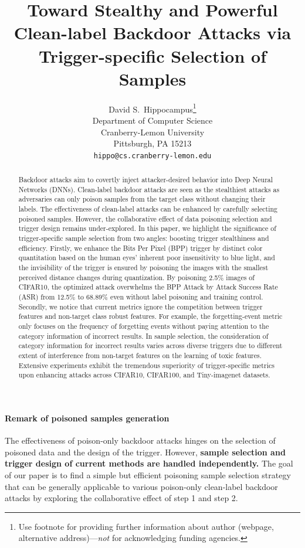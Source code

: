 \documentclass{article}
\title{Toward Stealthy and Powerful Clean-label Backdoor Attacks via Trigger-specific Selection of Samples}
\author{%
  David S.~Hippocampus\thanks{Use footnote for providing further information
    about author (webpage, alternative address)---\emph{not} for acknowledging
    funding agencies.} \\
  Department of Computer Science\\
  Cranberry-Lemon University\\
  Pittsburgh, PA 15213 \\
  \texttt{hippo@cs.cranberry-lemon.edu} \\
}
\begin{document}
\maketitle


\begin{abstract}
Backdoor attacks aim to covertly inject attacker-desired behavior into Deep Neural Networks (DNNs). Clean-label backdoor attacks are seen as the stealthiest attacks as adversaries can only poison samples from the target class without changing their labels. The effectiveness of clean-label attacks can be enhanced by carefully selecting poisoned samples. However, the collaborative effect of data poisoning selection and trigger design remains under-explored. In this paper, we highlight the significance of trigger-specific sample selection from two angles: boosting trigger stealthiness and efficiency. Firstly, we enhance the Bits Per Pixel (BPP) trigger by distinct color quantitation based on the human eyes' inherent poor insensitivity to blue light, and the invisibility of the trigger is ensured by poisoning the images with the smallest perceived distance changes during quantization. By poisoning 2.5\% images of CIFAR10, the optimized attack overwhelms the BPP Attack by Attack Success Rate (ASR) from 12.5\% to 68.89\% even without label poisoning and training control. Secondly, we notice that current metrics ignore the competition between trigger features and non-target class robust features. For example, the forgetting-event metric only focuses on the frequency of forgetting events without paying attention to the category information of incorrect results. In sample selection, the consideration of category information for incorrect results varies across diverse triggers due to different extent of interference from non-target features on the learning of toxic features. Extensive experiments exhibit the tremendous superiority of trigger-specific metrics upon enhancing attacks across CIFAR10, CIFAR100, and Tiny-imagenet datasets. 
\end{abstract}

\paragraph{Remark of poisoned samples generation}
The effectiveness of poison-only backdoor attacks hinges on the selection of poisoned data and the design of the trigger. However, \textbf{sample selection and trigger design of current methods are handled independently.} The goal of our paper is to find a simple but efficient poisoning sample selection strategy that can be generally applicable to various poison-only clean-label backdoor attacks by exploring the collaborative effect of step 1 and step 2. %
\end{document}
